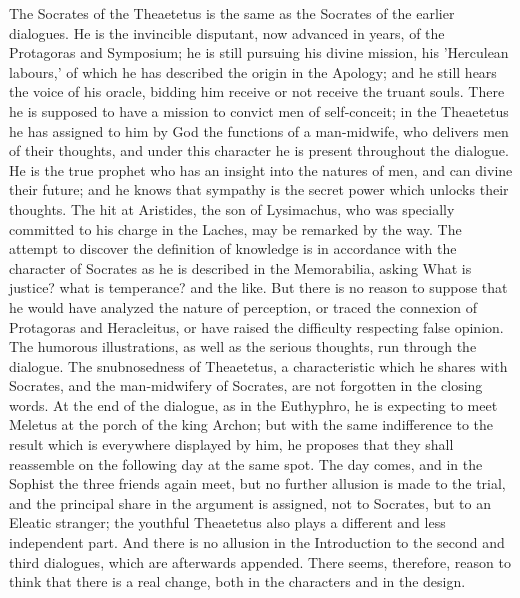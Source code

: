 The Socrates of the Theaetetus is the same as the Socrates of the
earlier dialogues. He is the invincible disputant, now advanced in
years, of the Protagoras and Symposium; he is still pursuing his divine
mission, his 'Herculean labours,' of which he has described the origin
in the Apology; and he still hears the voice of his oracle, bidding him
receive or not receive the truant souls. There he is supposed to have
a mission to convict men of self-conceit; in the Theaetetus he has
assigned to him by God the functions of a man-midwife, who delivers men
of their thoughts, and under this character he is present throughout the
dialogue. He is the true prophet who has an insight into the natures
of men, and can divine their future; and he knows that sympathy is the
secret power which unlocks their thoughts. The hit at Aristides, the son
of Lysimachus, who was specially committed to his charge in the Laches,
may be remarked by the way. The attempt to discover the definition
of knowledge is in accordance with the character of Socrates as he
is described in the Memorabilia, asking What is justice? what is
temperance? and the like. But there is no reason to suppose that he
would have analyzed the nature of perception, or traced the connexion
of Protagoras and Heracleitus, or have raised the difficulty respecting
false opinion. The humorous illustrations, as well as the serious
thoughts, run through the dialogue. The snubnosedness of Theaetetus, a
characteristic which he shares with Socrates, and the man-midwifery
of Socrates, are not forgotten in the closing words. At the end of the
dialogue, as in the Euthyphro, he is expecting to meet Meletus at the
porch of the king Archon; but with the same indifference to the result
which is everywhere displayed by him, he proposes that they shall
reassemble on the following day at the same spot. The day comes, and
in the Sophist the three friends again meet, but no further allusion is
made to the trial, and the principal share in the argument is assigned,
not to Socrates, but to an Eleatic stranger; the youthful Theaetetus
also plays a different and less independent part. And there is no
allusion in the Introduction to the second and third dialogues, which
are afterwards appended. There seems, therefore, reason to think that
there is a real change, both in the characters and in the design.

